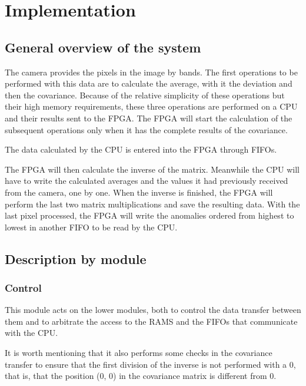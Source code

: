 \cleardoublepage
\chapter{Implementation}
\label{makereference}
\begin{minipage}{\textwidth}
\section{General overview of the system}
The camera provides the pixels in the image by bands. The first operations to be performed with this data are to calculate the average, with it the deviation and then the covariance. Because of the relative simplicity of these operations but their high memory requirements, these three operations are performed on a CPU and their results sent to the FPGA. The FPGA will start the calculation of the subsequent operations only when it has the complete results of the covariance.

The data calculated by the CPU is entered into the FPGA through FIFOs.

The FPGA will then calculate the inverse of the matrix. Meanwhile the CPU will have to write the calculated averages and the values it had previously received from the camera, one by one. When the inverse is finished, the FPGA will perform the last two matrix multiplications and save the resulting data. With the last pixel processed, the FPGA will write the anomalies ordered from highest to lowest in another FIFO to be read by the CPU.

\section{Description by module}
\subsection{Control}
This module acts on the lower modules, both to control the data transfer between them and to arbitrate the access to the RAMS and the FIFOs that communicate with the CPU.

It is worth mentioning that it also performs some checks in the covariance transfer to ensure that the first division of the inverse is not performed with a 0, that is, that the position (0, 0) in the covariance matrix is different from 0.
\end{minipage}
\setcounter{page}{20}

